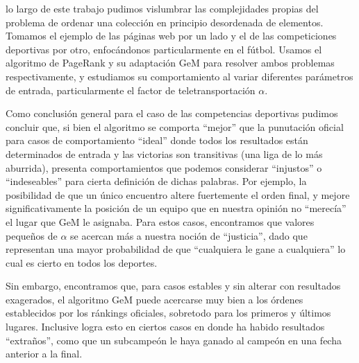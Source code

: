  lo largo de este trabajo pudimos vislumbrar las complejidades propias del problema de ordenar una colección en principio desordenada de elementos. Tomamos el ejemplo de las páginas web por un lado y el de las competiciones deportivas por otro, enfocándonos particularmente en el fútbol. Usamos el algoritmo de PageRank y su adaptación GeM para resolver ambos problemas respectivamente, y estudiamos su comportamiento al variar diferentes parámetros de entrada, particularmente el factor de teletransportación $\alpha$.

Como conclusión general para el caso de las competencias deportivas pudimos concluir que, si bien el algoritmo se comporta ``mejor'' que la punutación oficial para casos de comportamiento ``ideal'' donde todos los resultados están determinados de entrada y las victorias son transitivas (una liga de lo más aburrida), presenta comportamientos que podemos considerar ``injustos'' o ``indeseables'' para cierta definición de dichas palabras. Por ejemplo, la posibilidad de que un único encuentro altere fuertemente el orden final, y mejore significativamente la posición de un equipo que en nuestra opinión no ``merecía'' el lugar que GeM le asignaba. Para estos casos, encontramos que valores pequeños de $\alpha$ se acercan más a nuestra noción de ``justicia'', dado que representan una mayor probabilidad de que ``cualquiera le gane a cualquiera'' lo cual es cierto en todos los deportes.

Sin embargo, encontramos que, para casos estables y sin alterar con resultados exagerados, el algoritmo GeM puede acercarse muy bien a los órdenes establecidos por los ránkings oficiales, sobretodo para los primeros y últimos lugares. Inclusive logra esto en ciertos casos en donde ha habido resultados ``extraños'', como que un subcampeón le haya ganado al campeón en una fecha anterior a la final. 